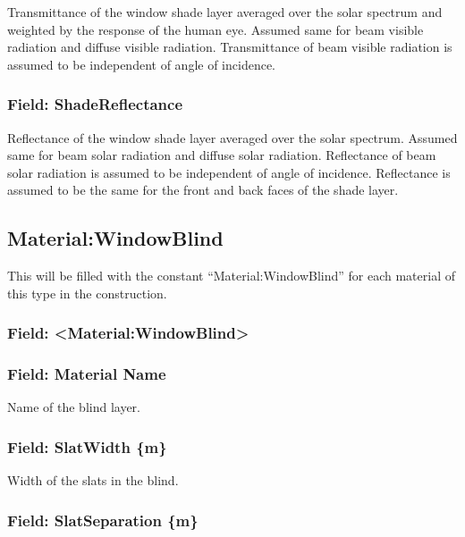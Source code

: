 Transmittance of the window shade layer averaged over the solar spectrum and weighted by the response of the human eye. Assumed same for beam visible radiation and diffuse visible radiation. Transmittance of beam visible radiation is assumed to be independent of angle of incidence.

\subsubsection{Field: ShadeReflectance}\label{field-shadereflectance}

Reflectance of the window shade layer averaged over the solar spectrum. Assumed same for beam solar radiation and diffuse solar radiation. Reflectance of beam solar radiation is assumed to be independent of angle of incidence. Reflectance is assumed to be the same for the front and back faces of the shade layer.

\subsection{Material:WindowBlind}\label{materialwindowblind}

This will be filled with the constant ``Material:WindowBlind'' for each material of this type in the construction.

\subsubsection{Field: \textless{}Material:WindowBlind\textgreater{}}\label{field-materialwindowblind}

\subsubsection{Field: Material Name}\label{field-material-name-5}

Name of the blind layer.

\subsubsection{Field: SlatWidth \{m\}}\label{field-slatwidth-m}

Width of the slats in the blind.

\subsubsection{Field: SlatSeparation \{m\}}\label{field-slatseparation-m}

